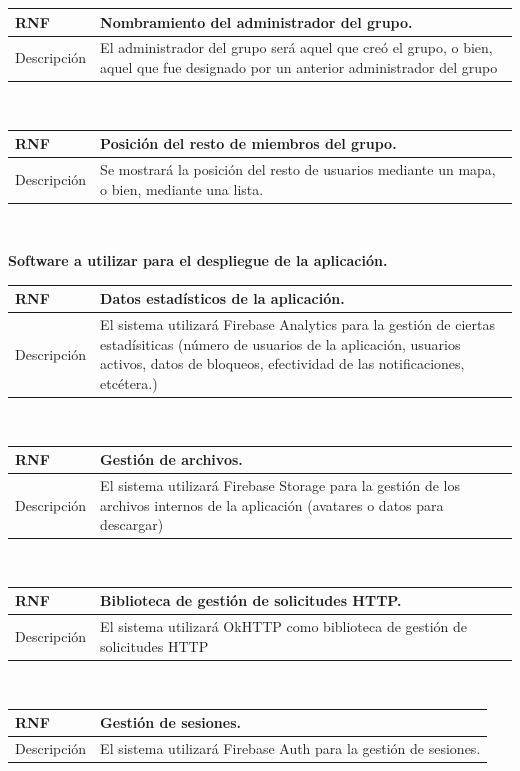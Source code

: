 \documentclass[twoside]{report}
\newcommand\addrow[2]{#1 &#2\\ }
\newcommand\addheading[2]{#1 &#2\\ \hline}
\newcommand\tabularhead{\begin{tabular}{lp{0.7\textwidth}}
\hline
}
\newenvironment{req}{\tabularhead}
{\hline\end{tabular}}
\begin{document}
\begin{req}
	\addheading{\textbf{RNF\arabic{nonFunctionalRequirements}}}{Nombramiento del administrador del grupo.}
	\addrow{Descripción}{El administrador del grupo será aquel que creó el grupo, o bien, aquel que fue designado por un anterior administrador del grupo}
\end{req}\\

\begin{req}
	\addheading{\textbf{RNF\arabic{nonFunctionalRequirements}}}{Posición del resto de miembros del grupo.}
	\addrow{Descripción}{Se mostrará la posición del resto de usuarios mediante un mapa, o bien, mediante una lista.}
\end{req}\\

\textbf{Software a utilizar para el despliegue de la aplicación.}\\

\begin{req}
	\addheading{\textbf{RNF\arabic{nonFunctionalRequirements}}}{Datos estadísticos de la aplicación.}
	\addrow{Descripción}{El sistema utilizará Firebase Analytics para la gestión de ciertas estadísiticas (número de usuarios de la aplicación, usuarios activos, datos de bloqueos, efectividad de las notificaciones, etcétera.)}
\end{req}\\

\begin{req}
	\addheading{\textbf{RNF\arabic{nonFunctionalRequirements}}}{Gestión de archivos.}
	\addrow{Descripción}{El sistema utilizará Firebase Storage para la gestión de los archivos internos de la aplicación (avatares o datos para descargar)}
\end{req}\\

\begin{req}
	\addheading{\textbf{RNF\arabic{nonFunctionalRequirements}}}{Biblioteca de gestión de solicitudes HTTP.}
	\addrow{Descripción}{El sistema utilizará OkHTTP como biblioteca de gestión de solicitudes HTTP}
\end{req}\\

\begin{req}
	\addheading{\textbf{RNF\arabic{nonFunctionalRequirements}}}{Gestión de sesiones.}
	\addrow{Descripción}{El sistema utilizará Firebase Auth para la gestión de sesiones.}
\end{req}\\
	
\end{document}
